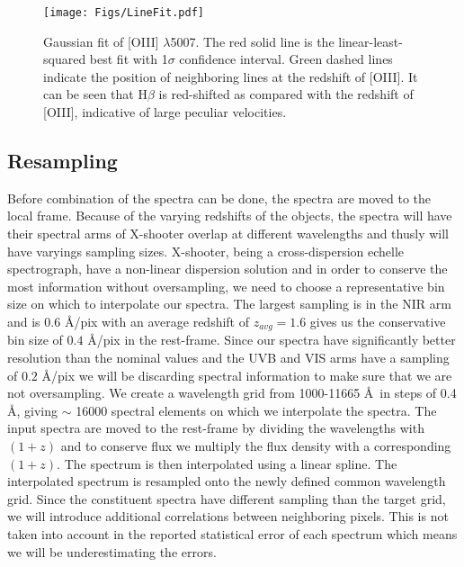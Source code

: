 \documentclass{aa}    %
\newcommand{\figlabel}[1]{\label{fig:#1}}
\newcommand{\sectlabel}[1]{\label{sect:#1}}
\begin{document}
\begin{figure}[t!]
  \centering
  \texttt{[image: Figs/LineFit.pdf]}
  \caption[]{Gaussian fit of [OIII] $\lambda$5007. The red solid line is the linear-least-squared best fit with 1$\sigma$ confidence interval. Green dashed lines indicate the position of neighboring lines at the redshift of [OIII]. It can be seen that H$\beta$ is red-shifted as compared with the redshift of [OIII], indicative of large peculiar velocities.}
  \figlabel{linefit}
\end{figure}

\subsection{Resampling} \sectlabel{rebin}

Before combination of the spectra can be done, the spectra are moved to the local frame. Because of the varying redshifts of the objects, the spectra will have their spectral arms of X-shooter overlap at different wavelengths and thusly will have varyings sampling sizes. X-shooter, being a cross-dispersion echelle spectrograph, have a non-linear dispersion solution and in order to conserve the most information without oversampling, we need to choose a representative bin size on which to interpolate our spectra. The largest sampling is in the NIR arm and is $0.6$ \AA/pix with an average redshift of $z_{avg} = 1.6$ gives us the conservative bin size of $0.4$ \AA/pix in the rest-frame. Since our spectra have significantly better resolution than the nominal values and the UVB and VIS arms have a sampling of $0.2$ \AA/pix we will be discarding spectral information to make sure that we are not oversampling. We create a wavelength grid from 1000-11665 \AA~in steps of 0.4 \AA, giving $\sim$ 16000 spectral elements on which we interpolate the spectra. The input spectra are moved to the rest-frame by dividing the wavelengths with $(1 + z)$ and to conserve flux we multiply the flux density with a corresponding $(1 + z)$. The spectrum is then interpolated using a linear spline. The interpolated spectrum is resampled onto the newly defined common wavelength grid. Since the constituent spectra have different sampling than the target grid, we will introduce additional correlations between neighboring pixels. This is not taken into account in the reported statistical error of each spectrum which means we will be underestimating the errors. 
\end{document}
